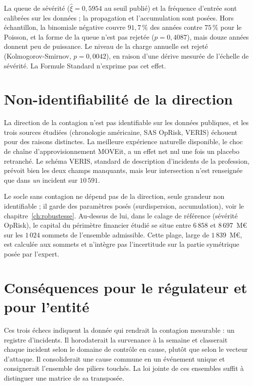 La queue de sévérité ($\hat\xi = 0{,}5954$ au seuil publié) et la fréquence d'entrée sont calibrées sur
les données ; la propagation et l'accumulation sont posées. Hors échantillon, la binomiale négative
couvre $91{,}7\,\%$ des années contre $75\,\%$ pour le Poisson, et la forme de la queue n'est pas rejetée
($p = 0{,}4087$), mais douze années donnent peu de puissance. Le niveau de la charge annuelle est rejeté
(Kolmogorov-Smirnov, $p = 0{,}0042$), en raison d'une dérive mesurée de l'échelle de sévérité. La
Formule Standard n'exprime pas cet effet.


\section*{Non-identifiabilité de la direction}
La direction de la contagion n'est pas identifiable sur les données publiques, et les trois sources
étudiées (chronologie américaine, SAS OpRisk, VERIS) échouent pour des raisons distinctes. La meilleure expérience naturelle disponible,
le choc de chaîne d'approvisionnement MOVEit, a un effet net nul une fois un placebo retranché. Le
schéma VERIS, standard de description d'incidents de la profession, prévoit bien les deux champs
manquants, mais leur intersection n'est renseignée que dans \emph{un} incident sur $10\,591$.

Le socle sans
contagion ne dépend pas de la direction, seule grandeur non identifiable ; il garde des paramètres posés
(surdispersion, accumulation), voir le chapitre~\ref{ch:robustesse}. Au-dessus de lui, dans le calage de référence (sévérité OpRisk), le capital du périmètre financier étudié se situe entre
$6\,858$ et $8\,697$~M\euro{} sur les $1\,024$ sommets de l'ensemble admissible. Cette plage, large de $1\,839$~M\euro{}, est calculée aux sommets et n'intègre pas l'incertitude sur la partie symétrique posée par l'expert.


\section*{Conséquences pour le régulateur et pour l'entité}
Ces trois échecs indiquent la donnée qui rendrait la contagion mesurable : un registre d'incidents.
Il horodaterait la survenance à la semaine et classerait chaque incident selon le domaine de
contrôle en cause, plutôt que selon le vecteur d'attaque. Il consoliderait une cause commune en un
événement unique et consignerait l'ensemble des piliers touchés. La loi jointe de ces ensembles
suffit à distinguer une matrice de sa transposée.

